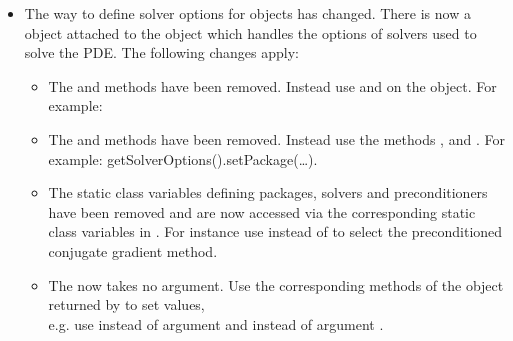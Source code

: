 \begin{itemize}
\item The way to define solver options for \LinearPDE objects has changed.
    There is now a \SolverOptions object attached to the \LinearPDE
    object which handles the options of solvers used to solve the PDE.
    The following changes apply:  
 \begin{itemize}
  \item The  and  methods
      have been removed. Instead use  and
       on the \SolverOptions object. For example:
  \item The  and  methods have
      been removed. Instead use the methods ,
       and . For example:
      getSolverOptions().setPackage(\ldots).
  \item The static class variables defining packages, solvers and
      preconditioners have been removed and are now accessed via the
      corresponding static class variables in \SolverOptions.
      For instance use  instead of
       to select the preconditioned conjugate gradient
      method.
  \item The  now takes no argument. Use the corresponding
      methods of the \SolverOptions object returned by
       to set values,\\ e.g. use
       instead of argument
       and 
      instead of argument .
 \end{itemize}
\end{itemize}

